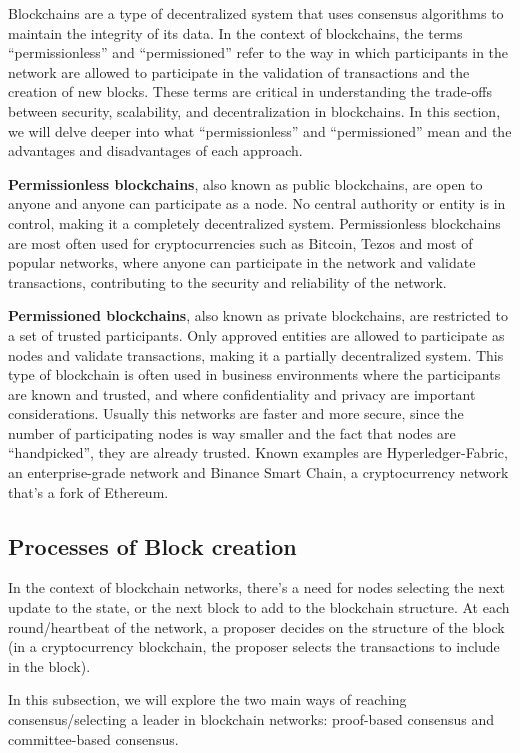 Blockchains are a type of decentralized system that uses consensus algorithms to maintain the integrity of its data. In the context of blockchains, the terms ``permissionless'' and ``permissioned'' refer to the way in which participants in the network are allowed to participate in the validation of transactions and the creation of new blocks.
These terms are critical in understanding the trade-offs between security, scalability, and decentralization in blockchains. In this section, we will delve deeper into what ``permissionless'' and ``permissioned'' mean and the advantages and disadvantages of each approach.

\textbf{Permissionless blockchains}, also known as public blockchains, are open to anyone and anyone can participate as a node. No central authority or entity is in control, making it a completely decentralized system. Permissionless blockchains are most often used for cryptocurrencies such as Bitcoin, Tezos and most of popular networks, where anyone can participate in the network and validate transactions, contributing to the security and reliability of the network.

\textbf{Permissioned blockchains}, also known as private blockchains, are restricted to a set of trusted participants. Only approved entities are allowed to participate as nodes and validate transactions, making it a partially decentralized system. This type of blockchain is often used in business environments where the participants are known and trusted, and where confidentiality and privacy are important considerations. Usually this networks are faster and more secure, since the number of participating nodes is way smaller and the fact that nodes are ``handpicked'', they are already trusted.
Known examples are Hyperledger-Fabric, an enterprise-grade network and Binance Smart Chain, a cryptocurrency network that's a fork of Ethereum.

\subsection*{Processes of Block creation}
In the context of blockchain networks, there's a need for nodes selecting the next update to the state, or the next block to add to the blockchain structure. At each round/heartbeat of the network, a proposer decides on the structure of the block (in a cryptocurrency blockchain, the proposer selects the transactions to include in the block).

In this subsection, we will explore the two main ways of reaching consensus/selecting a leader in blockchain networks: proof-based consensus and committee-based consensus.

